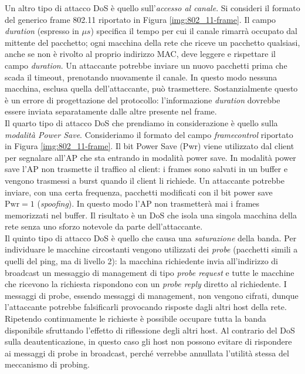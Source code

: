 Un altro tipo di attacco DoS è quello sull'\textit{accesso al canale}. Si consideri il formato del generico frame 802.11 riportato in Figura \ref{img:802_11-frame}. Il campo \textit{duration} (espresso in $\mu s$) specifica il tempo per cui il canale rimarrà occupato dal mittente del pacchetto; ogni macchina della rete che riceve un pacchetto qualsiasi, anche se non è rivolto al proprio indirizzo MAC, deve leggere e rispettare il campo \textit{duration}. Un attaccante potrebbe inviare un nuovo pacchetti prima che scada il timeout, prenotando nuovamente il canale. In questo modo nessuna macchina, esclusa quella dell'attaccante, può trasmettere. Sostanzialmente questo è un errore di progettazione del protocollo: l'informazione \textit{duration} dovrebbe essere inviata separatamente dalle altre presente nel frame.\\
Il quarto tipo di attacco DoS che prendiamo in considerazione è quello sulla \textit{modalità Power Save}. Consideriamo il formato del campo \textit{framecontrol} riportato in Figura \ref{img:802_11-frame}. Il bit Power Save (Pwr) viene utilizzato dal client per segnalare all'AP che sta entrando in modalità power save. In modalità power save l'AP non trasmette il traffico al client: i frames sono salvati in un buffer e vengono trasmessi a burst quando il client li richiede. Un attaccante potrebbe inviare, con una certa frequenza, pacchetti modificati con il bit power save $\text{Pwr} = 1$ (\textit{spoofing}). In questo modo l'AP non trasmetterà mai i frames memorizzati nel buffer. Il risultato è un DoS che isola una singola macchina della rete senza uno sforzo notevole da parte dell'attaccante.\\
Il quinto tipo di attacco DoS è quello che causa una \textit{saturazione} della banda. Per individuare le macchine circostanti vengono utilizzati dei \textit{probe} (pacchetti simili a quelli del ping, ma di livello 2): la macchina richiedente invia all'indirizzo di broadcast un messaggio di management di tipo \textit{probe request} e tutte le macchine che ricevono la richiesta rispondono con un \textit{probe reply} diretto al richiedente. I messaggi di probe, essendo messaggi di management, non vengono cifrati, dunque l'attaccante potrebbe falsificarli provocando risposte dagli altri host della rete. Ripetendo continuamente le richieste è possibile occupare tutta la banda disponibile sfruttando l'effetto di riflessione degli altri host. Al contrario del DoS sulla deautenticazione, in questo caso gli host non possono evitare di rispondere ai messaggi di probe in broadcast, perché verrebbe annullata l'utilità stessa del meccanismo di probing.\\
